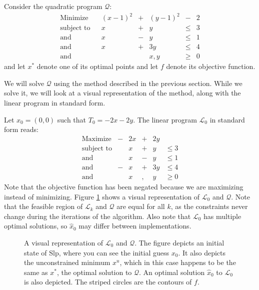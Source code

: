 Consider the quadratic program $\mathcal{Q}$:
\[
\begin{array}{lcrcrcr}
\textrm{Minimize}           & &   (x-1)^2 &+&   (y-1)^2 & - &  2 \\
\textrm{subject to}         & &         x &+&         y &\leq& 3 \\
\textrm{and}                & &         x &-&         y &\leq& 1 \\
\textrm{and}                & &         x &+&       3 y &\leq& 4 \\
\textrm{and}                & &           & &       x,y &\geq& 0
\end{array}
\]
and let $x^*$ denote one of its optimal points and let $f$ denote its objective
function.

We will solve $\mathcal{Q}$ using the method described in the previous
section. While we solve it, we will look at a visual representation of the
method, along with the linear program in standard form.

Let $x_0 = (0,0)$ such that $T_0 = -2x - 2y$. The linear program
$\mathcal{L}_0$ in standard form reads:
\[
\begin{array}{lcrcrl}
    \textrm{Maximize}   &-& 2 x &+& 2 y \\
    \textrm{subject to} & &   x &+&   y & \leq 3 \\
    \textrm{and}        & &   x &-&   y & \leq 1 \\
    \textrm{and}        &-&   x &+& 3 y & \leq 4 \\
    \textrm{and}        & &   x &,&   y & \geq 0
\end{array}
\]
Note that the objective function has been negated because we are maximizing
instead of minimizing.
Figure \ref{fig:lp1} shows a visual representation of $\mathcal{L}_0$ and
$\mathcal{Q}$.
Note that the feasible region of $\mathcal{L}_k$ and
$\mathcal{Q}$ are equal for all $k$, as the constraints never change during the
iterations of the algorithm. Also note that $\mathcal{L}_0$ has multiple
optimal solutions, so $\hat{x}_0$ may differ between implementations.

\begin{figure}[ht!]
    \centering
    
    \caption{A visual representation of $\mathcal{L}_0$ and $\mathcal{Q}$.
             The figure depicts an initial state
             of Slp, where you can see the initial guess $x_0$. It also
             depicts the unconstrained minimum $x^u$, which in this case
             happens to be the same as $x^*$, the optimal solution to
             $\mathcal{Q}$. An optimal solution $\hat{x}_0$ to $\mathcal{L}_0$
             is also depicted. The striped circles are the contours of $f$.}
    \label{fig:lp1}
\end{figure}

